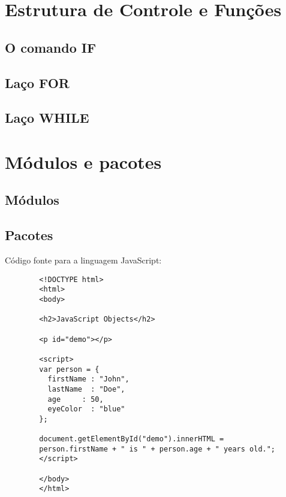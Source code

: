     \section{Estrutura de Controle e Fun\c{c}\~{o}es}

            \subsection{O comando IF}


            \subsection{La\c{c}o FOR}

            \subsection{La\c{c}o WHILE}


    \section{M\'{o}dulos e pacotes}



            \subsection{M\'{o}dulos}



            \subsection{Pacotes}






    C\'{o}digo fonte para a linguagem JavaScript:
    \begin{lstlisting}
        <!DOCTYPE html>
        <html>
        <body>

        <h2>JavaScript Objects</h2>

        <p id="demo"></p>

        <script>
        var person = {
          firstName : "John",
          lastName  : "Doe",
          age     : 50,
          eyeColor  : "blue"
        };

        document.getElementById("demo").innerHTML =
        person.firstName + " is " + person.age + " years old.";
        </script>

        </body>
        </html>
    \end{lstlisting}





